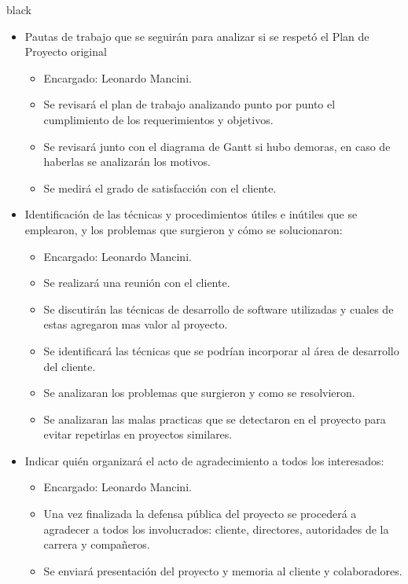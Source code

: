 \documentclass[
11pt, %
codirector, %
]{charter}
\begin{document}
\begin{consigna}{black}

\begin{itemize}
	\item Pautas de trabajo que se seguirán para analizar si se respetó el Plan de Proyecto original
	\begin{itemize}
	\item Encargado: Leonardo Mancini.
	\item Se revisará el plan de trabajo analizando punto por punto el cumplimiento de los requerimientos y objetivos.
	\item Se revisará junto con el diagrama de Gantt si hubo demoras, en caso de haberlas se analizarán los motivos.
	\item Se medirá el grado de satisfacción con el cliente.
	\end{itemize}
	 
	\item Identificación de las técnicas y procedimientos útiles e inútiles que se emplearon, y los problemas que surgieron y cómo se solucionaron:
	 \begin{itemize}
	\item Encargado: Leonardo Mancini.
	\item Se realizará una reunión con  el cliente.
	\item Se discutirán las técnicas de desarrollo de software utilizadas y cuales de estas agregaron mas valor al proyecto.
	\item Se identificará las técnicas que se podrían incorporar al área de desarrollo del cliente.
	\item Se analizaran los problemas que surgieron y como se resolvieron. 
	\item Se analizaran las malas practicas que se detectaron en el proyecto para evitar repetirlas en proyectos similares. 
	\end{itemize}
	\item Indicar quién organizará el acto de agradecimiento a todos los interesados:
	  \begin{itemize}
	\item Encargado: Leonardo Mancini.
	\item Una vez finalizada la defensa pública del proyecto se procederá a agradecer a todos los involucrados: cliente, directores, autoridades de la carrera y compañeros.
	\item Se enviará presentación del proyecto y memoria al cliente y colaboradores.
	
	\end{itemize}
\end{itemize}

\end{consigna}
\end{document}
